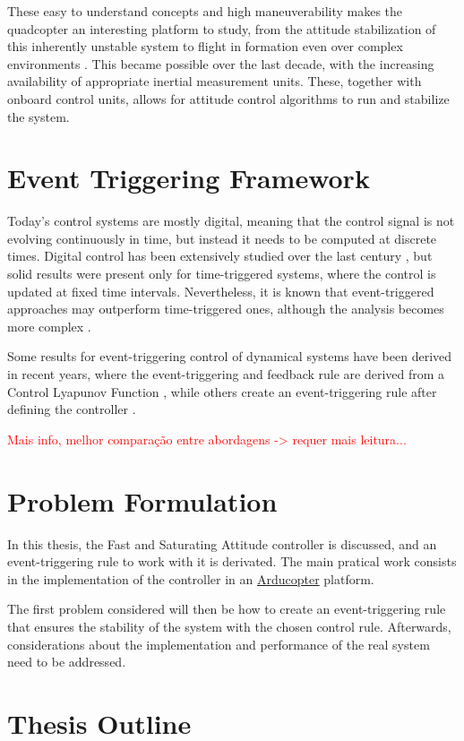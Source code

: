 	These easy to understand concepts and high maneuverability makes the quadcopter an interesting platform to study, from the attitude stabilization of this inherently unstable system \cite{quad_sieg}\cite{quad_hamel} to flight in formation even over complex environments \cite{quad_vijay}. This became possible over the last decade, with the increasing availability of appropriate inertial  measurement units. These, together with onboard control units, allows for attitude control algorithms to run and stabilize the system.
	
\section{Event Triggering Framework}

	Today's control systems are mostly digital, meaning that the control signal is not evolving continuously in time, but instead it needs to be computed at discrete times. Digital control has been extensively studied over the last century \cite{franklin_digital}\cite{astrom_digital}, but solid results were present only for time-triggered systems, where the control is updated at fixed time intervals. Nevertheless, it is known that event-triggered approaches may outperform time-triggered ones, although the analysis becomes more complex \cite{astrom_event2}\cite{astrom_event}. 
	
	Some results for event-triggering control of dynamical systems have been derived in recent years, where the event-triggering and feedback rule are derived from a Control Lyapunov Function \cite{castellanos_event}\cite{castellanos_event2}, while others create an event-triggering rule after defining the controller \cite{lehmann_event}\cite{tabuada_event_control}.
	
	\textcolor{red}{Mais info, melhor comparação entre abordagens -> requer mais leitura...}
	
\section{Problem Formulation}

	In this thesis, the Fast and Saturating Attitude controller \cite{lohmann_attitude} is discussed, and an event-triggering rule to work with it is derivated. The main pratical work consists in the implementation of the controller in an \href{http://copter.ardupilot.com/}{Arducopter} platform.
	
	The first problem considered will then be how to create an event-triggering rule that ensures the stability of the system with the chosen control rule. Afterwards, considerations about the implementation and performance of the real system need to be addressed.

\section{Thesis Outline}
